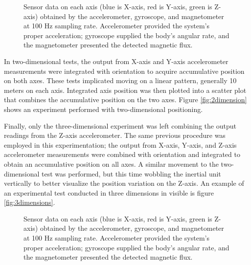 \begin{figure}
    \centering
    \resizebox{1\linewidth}{!}{}
    \caption{Sensor data on each axis (blue is X-axis, red is Y-axis, green is Z-axis) obtained by the accelerometer, gyroscope, and magnetometer at 100 Hz sampling rate. Accelerometer provided the system’s proper acceleration; gyroscope supplied the body’s angular rate, and the magnetometer presented the detected magnetic flux.}
\end{figure}

In two-dimensional tests, the output from X-axis and Y-axis accelerometer measurements were integrated with orientation to acquire accumulative position on both axes. These tests implicated moving on a linear pattern, generally 10 meters on each axis. Integrated axis position was then plotted into a scatter plot that combines the accumulative position on the two axes. Figure \ref{fig:2dimension} shows an experiment performed with two-dimensional positioning.



Finally, only the three-dimensional experiment was left combining the output readings from the Z-axis accelerometer. The same previous procedure was employed in this experimentation; the output from X-axis, Y-axis, and Z-axis accelerometer measurements were combined with orientation and integrated to obtain an accumulative position on all axes. A similar movement to the two-dimensional test was performed, but this time wobbling the inertial unit vertically to better visualize the position variation on the Z-axis. An example of an experimental test conducted in three dimensions in visible is figure \ref{fig:3dimensions}.

%     

\begin{figure}
    \centering
    \resizebox{1\linewidth}{!}{}
    \caption{Sensor data on each axis (blue is X-axis, red is Y-axis, green is Z-axis) obtained by the accelerometer, gyroscope, and magnetometer at 100 Hz sampling rate. Accelerometer provided the system’s proper acceleration; gyroscope supplied the body’s angular rate, and the magnetometer presented the detected magnetic flux.}
\end{figure}

